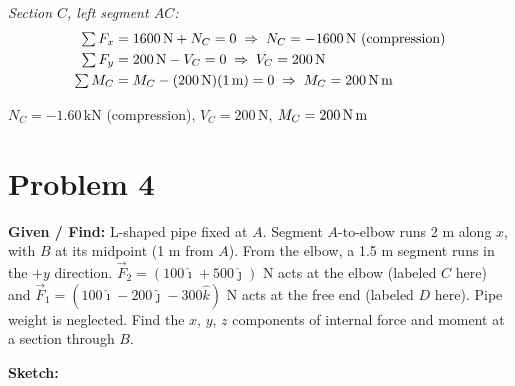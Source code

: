 \documentclass[11pt]{article}
\newcommand{\un}[1]{\,\text{#1}}
\begin{document}
\textit{Section $C$, left segment $AC$:}
\begin{align*}
\textstyle\sum F_x &= 1600\un{N} + N_C = 0 \;\Rightarrow\; N_C = -1600\un{N}\ \text{(compression)}\\
\textstyle\sum F_y &= 200\un{N} - V_C = 0 \;\Rightarrow\; V_C = 200\un{N}\\
\textstyle\sum M_C &= M_C - (200\un{N})(1\un{m}) = 0 \;\Rightarrow\; M_C = 200\un{N\,m}
\end{align*}

\begin{finalanswer}
$N_C = -1.60\un{kN}$ (compression), \quad $V_C = 200\un{N}$, \quad $M_C = 200\un{N\,m}$
\end{finalanswer}

\clearpage
\section*{Problem 4}

\textbf{Given / Find:} L-shaped pipe fixed at $A$. Segment $A$-to-elbow runs 2 m along $x$, with $B$ at its midpoint (1 m from $A$). From the elbow, a 1.5 m segment runs in the $+y$ direction. $\vec F_2 = (100\hat\imath + 500\hat\jmath)$ N acts at the elbow (labeled $C$ here) and $\vec F_1 = (100\hat\imath - 200\hat\jmath - 300\hat k)$ N acts at the free end (labeled $D$ here). Pipe weight is neglected. Find the $x$, $y$, $z$ components of internal force and moment at a section through $B$.

\textbf{Sketch:}
\end{document}
